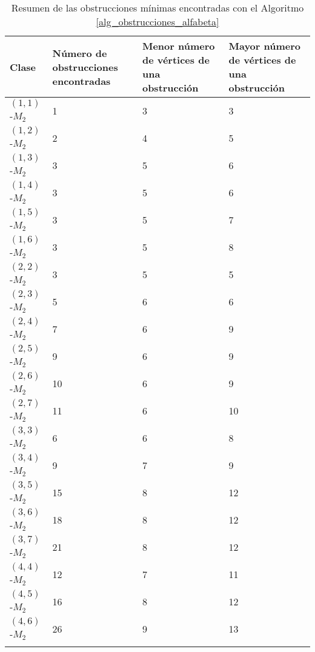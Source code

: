 \begin{center}
 \begin{longtable}{|C{3cm}|C{3cm}|C{3cm}|C{3cm}|} 
 
 \hline
 Clase & Número de obstrucciones encontradas & Menor número de vértices de una obstrucción & Mayor número de vértices de una obstrucción \\ 
 \hline\hline
 $(1,1)$-$M_2$ & 1 & 3 & 3 \\ \hline
 $(1,2)$-$M_2$ & 2 & 4 & 5 \\ \hline
 $(1,3)$-$M_2$ & 3 & 5 & 6 \\ \hline
 $(1,4)$-$M_2$ & 3 & 5 & 6 \\ \hline
 $(1,5)$-$M_2$ & 3 & 5 & 7 \\ \hline
 $(1,6)$-$M_2$ & 3 & 5 & 8 \\ \hline
 \hline
 $(2,2)$-$M_2$ & 3 & 5 & 5 \\ \hline
 $(2,3)$-$M_2$ & 5 & 6 & 6 \\ \hline
 $(2,4)$-$M_2$ & 7 & 6 & 9 \\ \hline
 $(2,5)$-$M_2$ & 9 & 6 & 9 \\ \hline
 $(2,6)$-$M_2$ & 10 & 6 & 9  \\ \hline
 $(2,7)$-$M_2$ & 11 & 6 & 10 \\ \hline
 \hline
 $(3,3)$-$M_2$ & 6 & 6 & 8 \\ \hline
 $(3,4)$-$M_2$ & 9 & 7 & 9 \\ \hline
 $(3,5)$-$M_2$ & 15 & 8 & 12 \\ \hline
 $(3,6)$-$M_2$ & 18 & 8 & 12 \\ \hline
 $(3,7)$-$M_2$ & 21 & 8 & 12 \\ \hline
 \hline
 $(4,4)$-$M_2$ & 12 & 7 & 11 \\ \hline
 $(4,5)$-$M_2$ & 16 & 8 & 12 \\ \hline
 $(4,6)$-$M_2$ & 26 & 9 & 13 \\ \hline
 
 \caption{Resumen de las obstrucciones mínimas encontradas con el Algoritmo \ref{alg_obstrucciones_alfabeta}}
 
\end{longtable}
\end{center}
